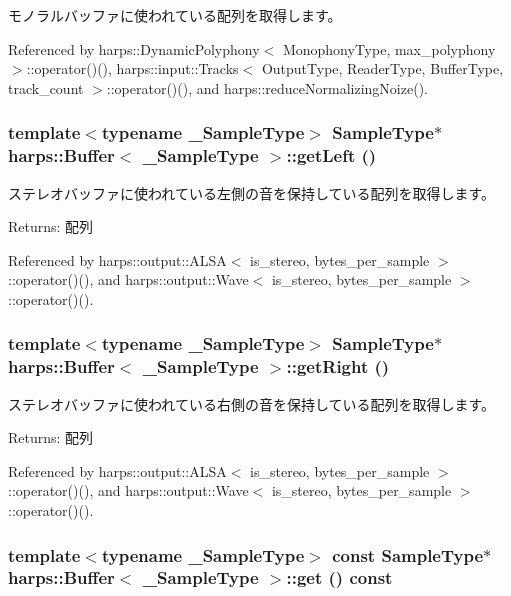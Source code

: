 モノラルバッファに使われている配列を取得します。 

Referenced by harps::DynamicPolyphony$<$ MonophonyType, max\_\-polyphony $>$::operator()(), harps::input::Tracks$<$ OutputType, ReaderType, BufferType, track\_\-count $>$::operator()(), and harps::reduceNormalizingNoize().
\subsubsection[getLeft]{\setlength{\rightskip}{0pt plus 5cm}template$<$typename \_\-SampleType$>$ SampleType$\ast$ {\bf harps::Buffer}$<$ \_\-SampleType $>$::getLeft ()\hspace{0.3cm}{\tt  [inline]}}\label{classharps_1_1Buffer_6050133c6cd1ab3db1c7a169633dddf4}


ステレオバッファに使われている左側の音を保持している配列を取得します。 \begin{Desc}
\item[Returns:]配列 \end{Desc}


Referenced by harps::output::ALSA$<$ is\_\-stereo, bytes\_\-per\_\-sample $>$::operator()(), and harps::output::Wave$<$ is\_\-stereo, bytes\_\-per\_\-sample $>$::operator()().
\subsubsection[getRight]{\setlength{\rightskip}{0pt plus 5cm}template$<$typename \_\-SampleType$>$ SampleType$\ast$ {\bf harps::Buffer}$<$ \_\-SampleType $>$::getRight ()\hspace{0.3cm}{\tt  [inline]}}\label{classharps_1_1Buffer_668b1ac5c2af479da54a29cbec5a55c7}


ステレオバッファに使われている右側の音を保持している配列を取得します。 \begin{Desc}
\item[Returns:]配列 \end{Desc}


Referenced by harps::output::ALSA$<$ is\_\-stereo, bytes\_\-per\_\-sample $>$::operator()(), and harps::output::Wave$<$ is\_\-stereo, bytes\_\-per\_\-sample $>$::operator()().
\subsubsection[get]{\setlength{\rightskip}{0pt plus 5cm}template$<$typename \_\-SampleType$>$ const SampleType$\ast$ {\bf harps::Buffer}$<$ \_\-SampleType $>$::get () const\hspace{0.3cm}{\tt  [inline]}}\label{classharps_1_1Buffer_97753c5714688c1be48ab451be12da34}


